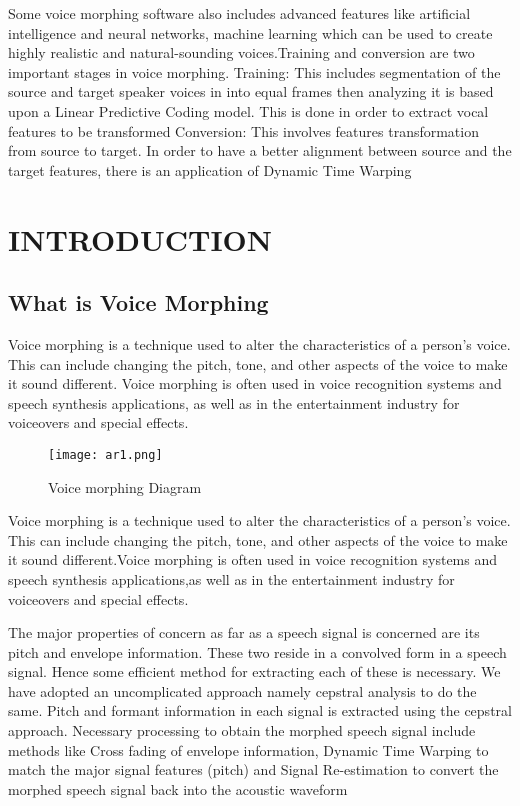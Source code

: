 \documentclass[12pt]{report}
\begin{document}
Some voice morphing software also includes advanced features like artificial intelligence and neural networks, machine learning which can be used to create highly realistic and natural-sounding voices.Training and conversion are two important stages in voice morphing.
Training: This includes segmentation of the source and target speaker voices in into equal frames  then analyzing it is based upon a Linear Predictive Coding model. This is done in order to extract vocal features to be transformed
Conversion: This involves features transformation from source to target. In order to have a better alignment between source and the target features, there is an application of Dynamic Time Warping 



\tableofcontents
\thispagestyle{empty}
\chapter{INTRODUCTION}  %
\section{What is Voice Morphing}
\setcounter{page}{1}
Voice morphing is a technique used to alter the characteristics of a person's voice. This can include 
changing the pitch, tone, and other aspects of the voice to make it sound different. Voice morphing is 
often used in voice recognition systems and speech synthesis applications, as well as in the entertainment 
industry for voiceovers and special effects.




\begin{figure}[h!]
\begin{center}
  \texttt{[image: ar1.png]}
  \caption{Voice morphing Diagram}
  \label{fig:is}
\end{center}
\end{figure}

\newpage
Voice morphing is a technique used to alter the characteristics of a person's voice. This can include 
changing the pitch, tone, and other aspects of the voice to make it sound different.Voice morphing is 
often used in voice recognition systems and speech synthesis applications,as well as in the entertainment 
industry for voiceovers and special effects.
\newline


The major properties of concern as far as a speech signal is 
concerned are its pitch and envelope information. These two reside in a convolved form in a speech 
signal. Hence some efficient method for extracting each of these is necessary. We have adopted an 
uncomplicated approach namely cepstral analysis to do the same. Pitch and formant information in each 
signal is extracted using the cepstral approach. Necessary processing to obtain the morphed speech signal 
include methods like Cross fading of envelope information, Dynamic Time Warping to match the major 
signal features (pitch) and Signal Re-estimation to convert the morphed speech signal back into the 
acoustic waveform
\newline
\end{document}
